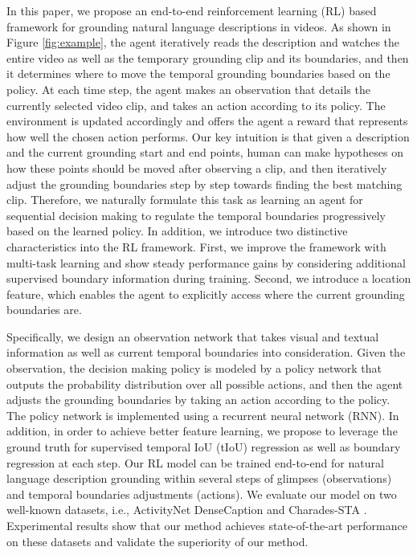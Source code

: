 \documentclass[letterpaper]{article} %
\begin{document}
In this paper, we propose an end-to-end reinforcement learning (RL) based framework for grounding natural language descriptions in videos.
As shown in Figure \ref{fig:example}, the agent iteratively reads the description and watches the entire video as well as the temporary grounding clip and its boundaries, and then it determines where to move the temporal grounding boundaries based on the policy. At each time step, the agent makes an observation that details the currently selected video clip, and takes an action according to its policy. The environment is updated accordingly and offers the agent a reward that represents how well the chosen action performs.
Our key intuition is that given a description and the current grounding start and end points, human can make hypotheses on how these points should be moved after observing a clip, and then iteratively adjust the grounding boundaries step by step towards finding the best matching clip. Therefore, we naturally formulate this task as learning an agent for sequential decision making to regulate the temporal boundaries progressively based on the learned policy. In addition, we introduce two distinctive characteristics into the RL framework. First, we improve the framework with multi-task learning and show steady performance gains by considering additional supervised boundary information during training. Second, we introduce a location feature, which enables the agent to explicitly access where the current grounding boundaries are.

Specifically, we design an observation network that takes visual and textual information as well as current temporal boundaries into consideration. Given the observation, the decision making policy is modeled by a policy network that outputs the probability distribution over all possible actions, and then the agent adjusts the grounding boundaries by taking an action according to the policy.
The policy network is implemented using a recurrent neural network (RNN).
In addition, in order to achieve better feature learning, we propose to leverage the ground truth for supervised temporal IoU (tIoU) regression as well as boundary regression at each step. Our RL model can be trained end-to-end for natural language description grounding within several steps of glimpses (observations) and temporal boundaries adjustments (actions). We evaluate our model on two well-known datasets, i.e., ActivityNet DenseCaption \cite{densecaption} and Charades-STA \cite{charades,tall}. Experimental results show that our method achieves state-of-the-art performance on these datasets and validate the superiority of our method.
\end{document}
